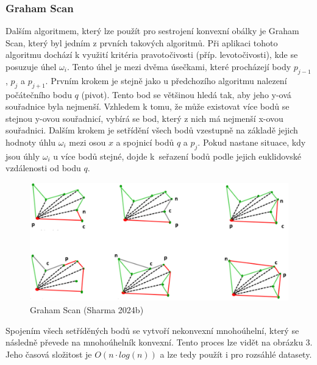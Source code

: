 \documentclass{article}
\begin{document}
\begin{spacing}{1.5}
\subsubsection{Graham Scan }
Dalším algoritmem, který lze použít pro sestrojení konvexní obálky je Graham Scan, který byl jedním z prvních takových algoritmů. Při aplikaci tohoto algoritmu dochází k využití kritéria pravotočivosti (příp. levotočivosti), kde se posuzuje úhel $\omega_i$. Tento úhel je mezi dvěma úsečkami, které procházejí body $p_{j-1}$, $p_j$ a $p_{j+1}$. Prvním krokem je stejně jako u předchozího algoritmu nalezení počátečního bodu $q$ (pivot). Tento bod se většinou hledá tak, aby jeho y-ová souřadnice byla nejmenší. Vzhledem k tomu, že může existovat více bodů se stejnou y-ovou souřadnicí, vybírá se bod, který z nich má nejmenší x-ovou souřadnici. Dalším krokem je setřídění všech bodů vzestupně na základě jejich hodnoty úhlu $\omega_i$ mezi osou $x$ a spojnicí bodů $q$ a $p_j$. Pokud nastane situace, kdy jsou úhly $\omega_i$ u více bodů stejné, dojde k~seřazení bodů podle jejich euklidovské vzdálenosti od bodu $q$. 

\begin{figure}[h]
    \centering
    \includegraphics[width=0.75\linewidth]{images/graham.png}
    \caption{Graham Scan (Sharma 2024b)}
    \label{fig:enter-label}
\end{figure}

Spojením všech setříděných bodů se vytvoří nekonvexní mnohoúhelní, který se následně převede na mnohoúhelník konvexní. Tento proces lze vidět na obrázku 3. Jeho časová složitost je $O(n\cdot log(n))$ a lze tedy použít i pro rozsáhlé datasety. 


\end{spacing}
\end{document}
